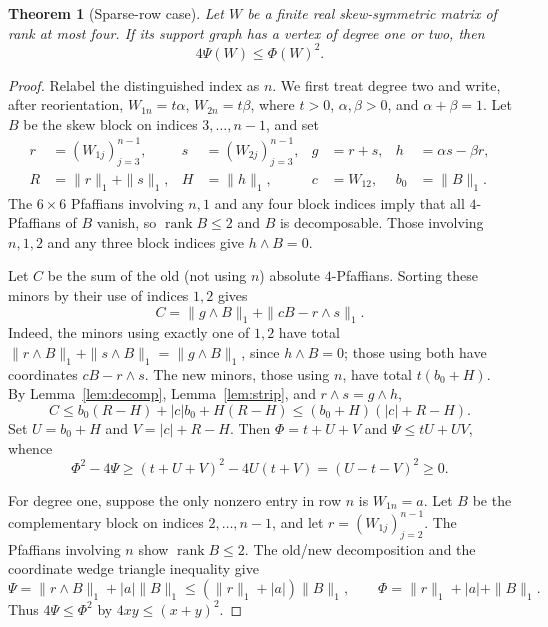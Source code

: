 \documentclass[11pt]{article}
\newtheorem{theorem}{Theorem}[section]
\begin{document}
\begin{theorem}[Sparse-row case]\label{thm:sparserow}
Let $W$ be a finite real skew-symmetric matrix of rank at most four. If its support graph has a vertex of degree one or two, then
\[
                         4\Psi(W)\leq\Phi(W)^2.
\]
\end{theorem}
\begin{proof}
Relabel the distinguished index as $n$. We first treat degree two and write, after reorientation,
$W_{1n}=t\alpha$, $W_{2n}=t\beta$, where $t>0$, $\alpha,\beta>0$, and $\alpha+\beta=1$. Let $B$ be the skew block on indices $3,\ldots,n-1$, and set
\[
 \begin{aligned}
 r&=(W_{1j})_{j=3}^{n-1},& s&=(W_{2j})_{j=3}^{n-1},& g&=r+s,& h&=\alpha s-\beta r,\\
 R&=\|r\|_1+\|s\|_1,& H&=\|h\|_1,& c&=W_{12},& b_0&=\|B\|_1.
\end{aligned}
\]
The $6\times6$ Pfaffians involving $n,1$ and any four block indices imply that all $4$-Pfaffians of $B$ vanish, so $\operatorname{rank}B\leq2$ and $B$ is decomposable. Those involving $n,1,2$ and any three block indices give $h\wedge B=0$.

Let $C$ be the sum of the old (not using $n$) absolute $4$-Pfaffians. Sorting these minors by their use of indices $1,2$ gives
\[
 C=\|g\wedge B\|_1+\|cB-r\wedge s\|_1.
\]
Indeed, the minors using exactly one of $1,2$ have total $\|r\wedge B\|_1+\|s\wedge B\|_1=\|g\wedge B\|_1$, since $h\wedge B=0$; those using both have coordinates $cB-r\wedge s$. The new minors, those using $n$, have total $t(b_0+H)$. By Lemma~\ref{lem:decomp}, Lemma~\ref{lem:strip}, and $r\wedge s=g\wedge h$,
\[
 C\leq b_0(R-H)+|c|b_0+H(R-H)
   \leq(b_0+H)(|c|+R-H).
\]
Set $U=b_0+H$ and $V=|c|+R-H$. Then $\Phi= t+U+V$ and $\Psi\leq tU+UV$, whence
\[
 \Phi^2-4\Psi\geq(t+U+V)^2-4U(t+V)=(U-t-V)^2\geq0.
\]

For degree one, suppose the only nonzero entry in row $n$ is $W_{1n}=a$. Let $B$ be the complementary block on indices $2,\ldots,n-1$, and let $r=(W_{1j})_{j=2}^{n-1}$. The Pfaffians involving $n$ show $\operatorname{rank}B\leq2$. The old/new decomposition and the coordinate wedge triangle inequality give
\[
 \Psi=\|r\wedge B\|_1+|a|\|B\|_1
 \leq(\|r\|_1+|a|)\|B\|_1,
 \qquad \Phi=\|r\|_1+|a|+\|B\|_1.
\]
Thus $4\Psi\leq\Phi^2$ by $4xy\leq(x+y)^2$.
\end{proof}
\end{document}
